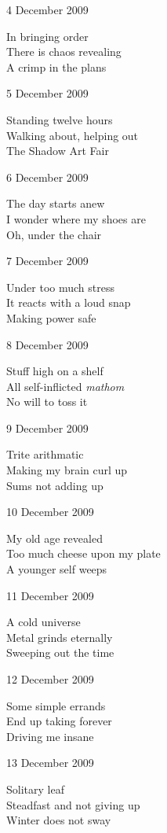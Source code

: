 \documentclass[12pt]{article}
\begin{document}
\newpage

4 December 2009

In bringing order \\
There is chaos revealing \\
A crimp in the plans

5 December 2009

Standing twelve hours \\
Walking about, helping out \\
The Shadow Art Fair

6 December 2009

The day starts anew \\
I wonder where my shoes are \\
Oh, under the chair

7 December 2009

Under too much stress \\
It reacts with a loud snap \\
Making power safe

8 December 2009

Stuff high on a shelf \\
All self-inflicted {\em mathom} \\
No will to toss it

9 December 2009

Trite arithmatic \\
Making my brain curl up \\
Sums not adding up

10 December 2009

My old age revealed \\
Too much cheese upon my plate \\
A younger self weeps


\newpage

11 December 2009

A cold universe \\
Metal grinds eternally \\
Sweeping out the time

12 December 2009

Some simple errands \\
End up taking forever \\
Driving me insane

13 December 2009

Solitary leaf \\
Steadfast and not giving up \\
Winter does not sway
\end{document}
